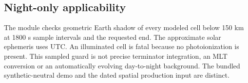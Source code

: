 \subsection{Night-only applicability}
The module checks geometric Earth shadow of every modeled cell below 150 km
at 1800 s sample intervals and the requested end. The approximate solar
ephemeris uses UTC. An illuminated cell is fatal because no photoionization
is present. This sampled guard is not precise terminator integration, an MLT
conversion or an automatically evolving day-to-night background. The bundled
synthetic-neutral demo and the dated spatial production input are distinct.
